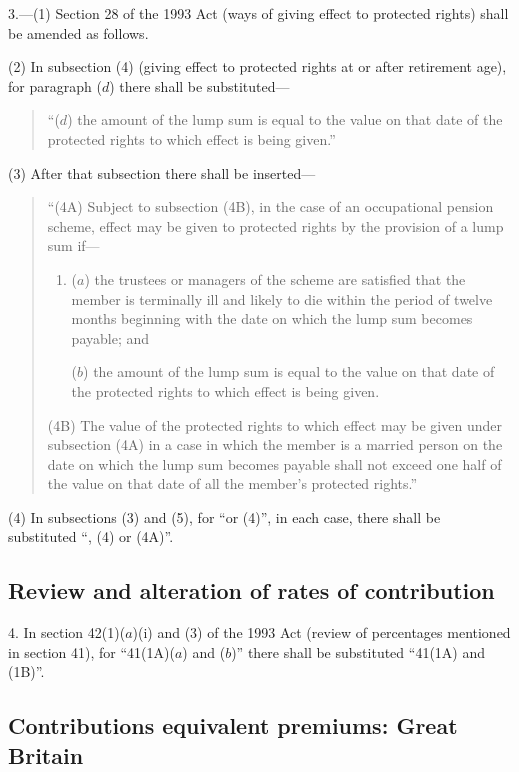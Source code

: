 \documentclass[12pt,a4paper]{article}
\begin{document}
3.---(1) Section 28 of the 1993 Act (ways of giving effect to protected rights) shall be amended as follows.

(2) In subsection (4)  (giving effect to protected rights at or after retirement age), for paragraph ($d$)  there shall be substituted—
\begin{quotation}
“($d$) the amount of the lump sum is equal to the value on that date of the protected rights to which effect is being given.”
\end{quotation}

(3) After that subsection there shall be inserted—
\begin{quotation}
“(4A) Subject to subsection (4B), in the case of an occupational pension scheme, effect may be given to protected rights by the provision of a lump sum if—
\begin{enumerate}\item[]
($a$) the trustees or managers of the scheme are satisfied that the member is terminally ill and likely to die within the period of twelve months beginning with the date on which the lump sum becomes payable; and

($b$) the amount of the lump sum is equal to the value on that date of the protected rights to which effect is being given.
\end{enumerate}

(4B) The value of the protected rights to which effect may be given under subsection (4A)  in a case in which the member is a married person on the date on which the lump sum becomes payable shall not exceed one half of the value on that date of all the member’s protected rights.”
\end{quotation}

(4) In subsections (3)  and (5), for “or (4)”, in each case, there shall be substituted “, (4)  or (4A)”.

\subsection*{Review and alteration of rates of contribution}

4. In section 42(1)($a$)(i)  and (3)  of the 1993 Act (review of percentages mentioned in section 41), for “41(1A)($a$)  and ($b$)” there shall be substituted “41(1A)  and (1B)”.

\subsection*{Contributions equivalent premiums: Great Britain}
\end{document}
